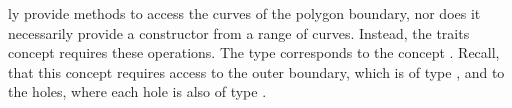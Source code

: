 ly provide methods to access the curves of the polygon boundary, nor 
does it necessarily provide a constructor from a range of curves. Instead, 
the traits concept requires these operations. The type 
 corresponds to the concept 
. Recall, that this concept 
requires access to the outer boundary, which is of type , 
and to the holes, where each hole is also of type .

